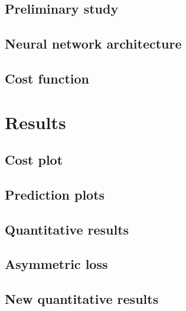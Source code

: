 \documentclass[aspectratio=169, 10pt]{beamer}
\begin{document}
\subsection{Preliminary study}


\subsection{Neural network architecture}



\subsection{Cost function}



\section{Results}

\subsection{Cost plot}


\subsection{Prediction plots}


\subsection{Quantitative results}


\subsection{Asymmetric loss}


\subsection {New quantitative results}


\end{document}
